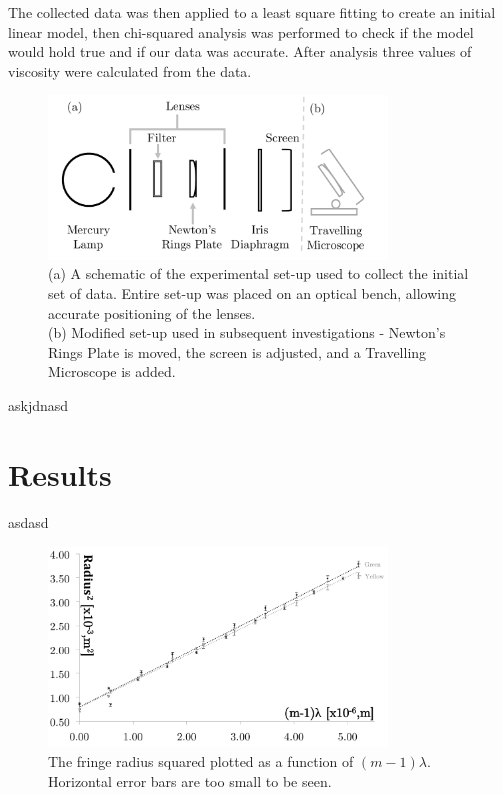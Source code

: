 \documentclass[twocolumn]{revtex4}
\begin{document}
The collected data was then applied to a least square fitting to create an initial linear model, then chi-squared analysis was performed to check if the model would hold true and if our data was accurate. After analysis three values of viscosity were calculated from the data. 

\begin{figure}[!h]
\begin{center}
\includegraphics[width=9cm]{fig1}
\caption[]{(a) A schematic of the experimental set-up used to collect the initial set of data. Entire set-up was placed on an optical bench, allowing accurate positioning of the lenses.
\\
(b) Modified set-up used in subsequent investigations - Newton's Rings Plate is moved, the screen is adjusted, and a Travelling Microscope is added.}
\label{fig:fig1}
\end{center}
\end{figure}

askjdnasd

\vspace{-3ex}
\section{Results}
\vspace{-2ex}

asdasd

\vspace{-1ex}
\begin{figure}[!h]
\begin{center}
\includegraphics[width=9cm]{fig2}
\caption[]{The fringe radius squared plotted as a function of $(m-1)\lambda$. Horizontal error bars are too small to be seen.}
\label{fig:fig2}
\end{center}
\end{figure}
\end{document}
